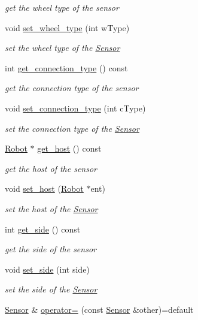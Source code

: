 \begin{DoxyCompactItemize}
\begin{DoxyCompactList}\small\item\em get the wheel type of the sensor \end{DoxyCompactList}\item 
void \hyperlink{classSensor_a0701f9b3bd7d1752783f25f4c363f1ac}{set\+\_\+wheel\+\_\+type} (int w\+Type)
\begin{DoxyCompactList}\small\item\em set the wheel type of the \hyperlink{classSensor}{Sensor} \end{DoxyCompactList}\item 
int \hyperlink{classSensor_a6f8db068a8e06136f407313eecf2221f}{get\+\_\+connection\+\_\+type} () const 
\begin{DoxyCompactList}\small\item\em get the connection type of the sensor \end{DoxyCompactList}\item 
void \hyperlink{classSensor_a1009db4a9b7809a76cd66d3bf7843615}{set\+\_\+connection\+\_\+type} (int c\+Type)
\begin{DoxyCompactList}\small\item\em set the connection type of the \hyperlink{classSensor}{Sensor} \end{DoxyCompactList}\item 
\hyperlink{classRobot}{Robot} $\ast$ \hyperlink{classSensor_a3d2569489f55e35cd73237e1ce4a0fbf}{get\+\_\+host} () const 
\begin{DoxyCompactList}\small\item\em get the host of the sensor \end{DoxyCompactList}\item 
void \hyperlink{classSensor_a21b4c8d697421b9ad5eb1376812a89f6}{set\+\_\+host} (\hyperlink{classRobot}{Robot} $\ast$ent)
\begin{DoxyCompactList}\small\item\em set the host of the \hyperlink{classSensor}{Sensor} \end{DoxyCompactList}\item 
int \hyperlink{classSensor_a548b03053830bac711fc35675af87093}{get\+\_\+side} () const 
\begin{DoxyCompactList}\small\item\em get the side of the sensor \end{DoxyCompactList}\item 
void \hyperlink{classSensor_a3059a194b225f0aa44b67c2a57c00c47}{set\+\_\+side} (int side)
\begin{DoxyCompactList}\small\item\em set the side of the \hyperlink{classSensor}{Sensor} \end{DoxyCompactList}\item 
\hyperlink{classSensor}{Sensor} \& \hyperlink{classSensor_a48b21cd29fa3f183a2fb9e6447de2219}{operator=} (const \hyperlink{classSensor}{Sensor} \&other)=default\hypertarget{classSensor_a48b21cd29fa3f183a2fb9e6447de2219}{}\label{classSensor_a48b21cd29fa3f183a2fb9e6447de2219}


\end{DoxyCompactItemize}
